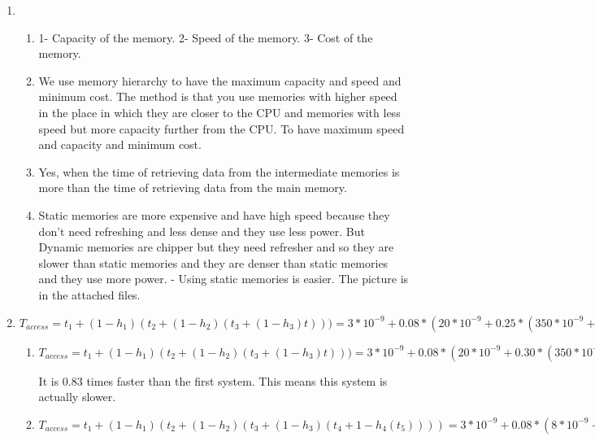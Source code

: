 \documentclass[12pt]{article}
\begin{document}
\begin{enumerate}
\begin{table}[h]
\begin{tabular}{|c|c|c|c|c|}
            \end{tabular}

        \end{table}
        The circuit is in the attached files.


    \item
        \begin{enumerate}
            \item
                1- Capacity of the memory.
                2- Speed of the memory.
                3- Cost of the memory.
            \item
                We use memory hierarchy to have the maximum capacity
                and speed and minimum cost. The method is that you use memories
                with higher speed in the place in which they are closer to the
                CPU and memories with less speed but more capacity further from
                the CPU. To have maximum speed and capacity and minimum cost.

            \item
                Yes, when the time of retrieving data from the intermediate
                memories is more than the time of retrieving data from the main
                memory.
            \item
                Static memories are more expensive and have high speed because
                they don't need refreshing and less dense and they use less power.
                But Dynamic memories are chipper but they need refresher and so
                they are slower than static memories and they are denser than
                static memories and they use more power. - Using static memories
                is easier.
                The picture is in the attached files.
        \end{enumerate}
    \item

        $T_{access}=t_1+(1-h_1)(t_2+(1-h_2)(t_3+(1-h_3)t)))=
        3*10^{-9}+0.08*(20*10^{-9}+0.25*(350*10^{-9}+0.65*12*10^{-3}))=1.56*10^{-4} s$
        \begin{enumerate}
            \item
                $T_{access}=t_1+(1-h_1)(t_2+(1-h_2)(t_3+(1-h_3)t)))=
                3*10^{-9}+0.08*(20*10^{-9}+0.30*(350*10^{-9}+0.65*12*10^{-3}))=1.87213*10^{-4}$

                It is 0.83 times faster than the first system.
                This means this system is actually slower.
            \item
                $T_{access}=t_1+(1-h_1)(t_2+(1-h_2)(t_3+(1-h_3)(t_4+1-h_4(t_5))))=
                3*10^{-9}+0.08*(8*10^{-9}+0.15*(20*10^{-9}+0.3*(10^{-9}*350+0.65*
                10^{-3}*12)))=2.81*10^{-5}$


\end{enumerate}
\end{enumerate}
\end{document}
